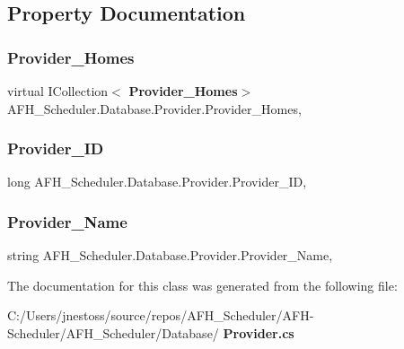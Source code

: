 \subsection{Property Documentation}
\mbox{\label{class_a_f_h___scheduler_1_1_database_1_1_provider_ac369a8d9cc42d098a7334b14e1626c47}} 
\subsubsection{Provider\_Homes}
{\footnotesize\ttfamily virtual I\+Collection$<$\textbf{ Provider\+\_\+\+Homes}$>$ A\+F\+H\+\_\+\+Scheduler.\+Database.\+Provider.\+Provider\+\_\+\+Homes\hspace{0.3cm}{\ttfamily [get]}, {\ttfamily [set]}}

\mbox{\label{class_a_f_h___scheduler_1_1_database_1_1_provider_a48cafcd02e6cd2bbb88ed639adb6b610}} 
\subsubsection{Provider\_ID}
{\footnotesize\ttfamily long A\+F\+H\+\_\+\+Scheduler.\+Database.\+Provider.\+Provider\+\_\+\+ID\hspace{0.3cm}{\ttfamily [get]}, {\ttfamily [set]}}

\mbox{\label{class_a_f_h___scheduler_1_1_database_1_1_provider_afed0a414f159b1569092f6296add8d56}} 
\subsubsection{Provider\_Name}
{\footnotesize\ttfamily string A\+F\+H\+\_\+\+Scheduler.\+Database.\+Provider.\+Provider\+\_\+\+Name\hspace{0.3cm}{\ttfamily [get]}, {\ttfamily [set]}}



The documentation for this class was generated from the following file\+:\begin{DoxyCompactItemize}
\item 
C\+:/\+Users/jnestoss/source/repos/\+A\+F\+H\+\_\+\+Scheduler/\+A\+F\+H-\/\+Scheduler/\+A\+F\+H\+\_\+\+Scheduler/\+Database/\textbf{ Provider.\+cs}\end{DoxyCompactItemize}
